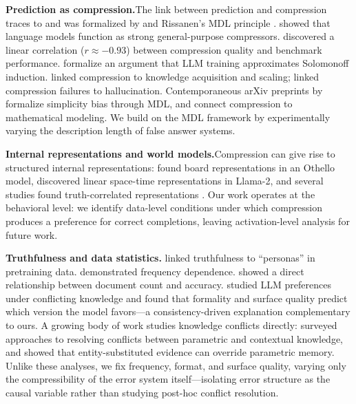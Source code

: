 \documentclass{article}
\begin{document}
\textbf{Prediction as compression.}\quad The link between prediction and compression traces to \citet{shannon1948mathematical} and was formalized by \citet{solomonoff1964formal} and Rissanen's MDL principle \citep{rissanen1978modeling,grunwald2007minimum}. \citet{deletang2024language} showed that language models function as strong general-purpose compressors. \citet{huang2024compression} discovered a linear correlation ($r \approx -0.93$) between compression quality and benchmark performance. \citet{wan2025large} formalize an argument that LLM training approximates Solomonoff induction. \citet{pan2025understanding} linked compression to knowledge acquisition and scaling; \citet{chlon2025predictable} linked compression failures to hallucination. Contemporaneous arXiv preprints by \citet{marty2026compression} formalize simplicity bias through MDL, and \citet{aksenov2026compression} connect compression to mathematical modeling. We build on the MDL framework by experimentally varying the description length of false answer systems.

\textbf{Internal representations and world models.}\quad Compression can give rise to structured internal representations: \citet{li2023a_emergent} found board representations in an Othello model, \citet{gurnee2024language} discovered linear space-time representations in Llama-2, and several studies found truth-correlated representations \citep{marks2024geometry,burns2023discovering,li2023b_inference,azaria2023internal,ravfogel2025emergence}. Our work operates at the behavioral level: we identify data-level conditions under which compression produces a preference for correct completions, leaving activation-level analysis for future work.

\textbf{Truthfulness and data statistics.}\quad \citet{joshi2024personas} linked truthfulness to ``personas'' in pretraining data. \citet{elazar2022measuring} demonstrated frequency dependence. \citet{kandpal2023large} showed a direct relationship between document count and accuracy. \citet{li2024formality} studied LLM preferences under conflicting knowledge and found that formality and surface quality predict which version the model favors---a consistency-driven explanation complementary to ours. A growing body of work studies knowledge conflicts directly: \citet{xie2024adaptive} surveyed approaches to resolving conflicts between parametric and contextual knowledge, and \citet{longpre2021entity} showed that entity-substituted evidence can override parametric memory. Unlike these analyses, we fix frequency, format, and surface quality, varying only the compressibility of the error system itself---isolating error structure as the causal variable rather than studying post-hoc conflict resolution.
\end{document}
